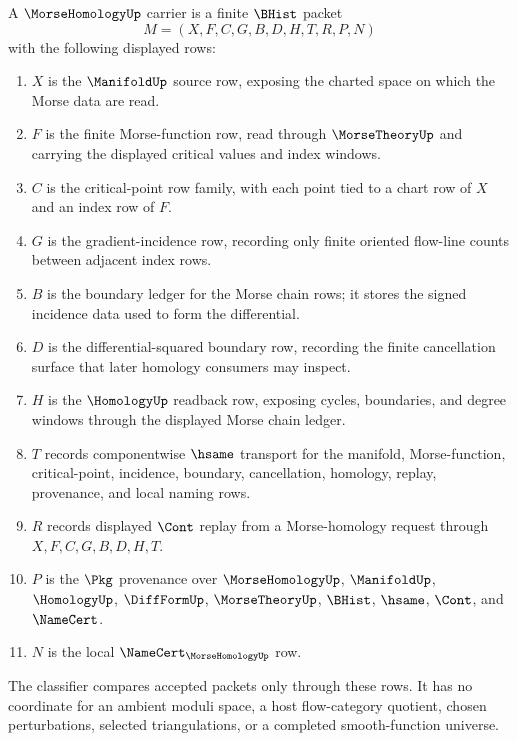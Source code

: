 \begin{definition}
\label{def:morse-homology-carrier}
A $\MorseHomologyUp$ carrier is a finite $\BHist$ packet
$$
M=(X,F,C,G,B,D,H,T,R,P,N)
$$
with the following displayed rows:
\begin{enumerate}
\item $X$ is the $\ManifoldUp$ source row, exposing the charted space on which the Morse data are read.
\item $F$ is the finite Morse-function row, read through $\MorseTheoryUp$ and carrying the displayed critical values and index windows.
\item $C$ is the critical-point row family, with each point tied to a chart row of $X$ and an index row of $F$.
\item $G$ is the gradient-incidence row, recording only finite oriented flow-line counts between adjacent index rows.
\item $B$ is the boundary ledger for the Morse chain rows; it stores the signed incidence data used to form the differential.
\item $D$ is the differential-squared boundary row, recording the finite cancellation surface that later homology consumers may inspect.
\item $H$ is the $\HomologyUp$ readback row, exposing cycles, boundaries, and degree windows through the displayed Morse chain ledger.
\item $T$ records componentwise $\hsame$ transport for the manifold, Morse-function, critical-point, incidence, boundary, cancellation, homology, replay, provenance, and local naming rows.
\item $R$ records displayed $\Cont$ replay from a Morse-homology request through $X,F,C,G,B,D,H,T$.
\item $P$ is the $\Pkg$ provenance over $\MorseHomologyUp$, $\ManifoldUp$, $\HomologyUp$, $\DiffFormUp$, $\MorseTheoryUp$, $\BHist$, $\hsame$, $\Cont$, and $\NameCert$.
\item $N$ is the local $\NameCert_{\MorseHomologyUp}$ row.
\end{enumerate}
The classifier compares accepted packets only through these rows. It has no coordinate for an ambient moduli space, a host flow-category quotient, chosen perturbations, selected triangulations, or a completed smooth-function universe.
\end{definition}

